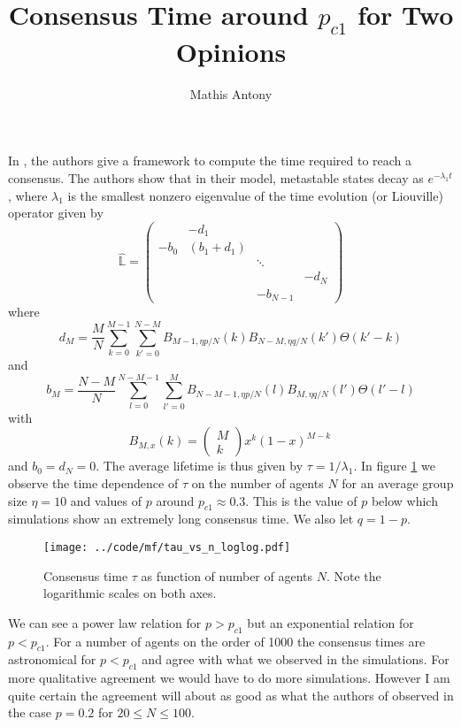 \documentclass[a4paper,12pt]{scrartcl}
\title{Consensus Time around $p_{c1}$ for Two Opinions}
\author{Mathis Antony}
\begin{document}
\maketitle

In \cite{Schmittmann2010}, the authors give a framework to compute the time required to reach a consensus. The authors show that in their model, metastable states decay as $e^{-\lambda_1 t}$, where $\lambda_1$ is the smallest nonzero eigenvalue of the time evolution (or Liouville) operator given by
\begin{equation}
\widehat{\mathbb{L}} = \left( \begin{array}{cccc}  & - d_1 & &  \\ 
-b_0 & (b_1+d_1) & & \\
&  & \ddots & \\
& & & -d_N \\
 & & -b_{N-1} & 
\end{array}
 \right) 
\end{equation}
where 
\begin{equation}
d_M = \frac{M}{N} \sum_{k=0}^{M-1}\sum_{k'=0}^{N-M} B_{M-1,\eta p/N}(k) B_{N-M,\eta q/N}(k') \Theta(k'-k)
\end{equation}
and
\begin{equation}
b_M = \frac{N-M}{N} \sum_{l=0}^{N-M-1}\sum_{l'=0}^{M} B_{N-M-1,\eta p/N}(l) B_{M,\eta q/N}(l') \Theta(l'-l)
\end{equation}
with
\begin{equation}
B_{M,x}(k) =  \left( \begin{array}{c}M\\k\end{array} \right)
x^k (1-x)^{M-k} \, 
\end{equation}
and $b_0=d_N=0$. The average lifetime is thus given by $\tau=1/\lambda_1$. In figure \ref{fig:1} we observe the time dependence of $\tau$ on the number of agents $N$ for an average group size $\eta=10$ and values of $p$ around $p_{c1}\approx 0.3$. This is the value of $p$ below which simulations show an extremely long consensus time. We also let $q=1-p$.
%
\begin{figure}[h]
\centering
\texttt{[image: ../code/mf/tau\_vs\_n\_loglog.pdf]}
\caption{Consensus time $\tau$ as function of number of agents $N$. Note the logarithmic scales on both axes.}
\label{fig:1}
\end{figure}
%
We can see a power law relation for $p>p_{c1}$ but an exponential relation for $p<p_{c1}$. For a number of agents on the order of 1000 the consensus times are astronomical for $p<p_{c1}$ and agree with what we observed in the simulations. For more qualitative agreement we would have to do more simulations. However I am quite certain the agreement will about as good as what the authors of \cite{PhysRevE.79.046104} observed in the case $p=0.2$ for $20\leq N \leq 100$.
\end{document}
